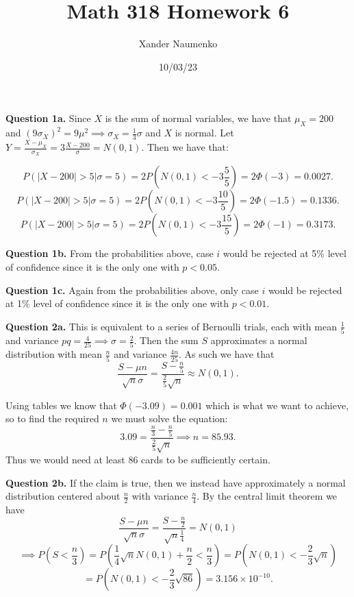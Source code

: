\documentclass[letterpaper, reqno,11pt]{article}
\begin{document}
\title{Math 318 Homework 6}
\date{10/03/23}
\author{Xander Naumenko}
\maketitle

{\medskip\noindent\bf Question 1a.} Since $X$ is the sum of normal variables, we have that $\mu_X=200$ and $(9\sigma_X)^2=9\mu ^2\implies\sigma_X=\frac{1}{3}\sigma$ and $X$ is normal. Let $Y=\frac{X-\mu_X}{\sigma_X}=3 \frac{X-200}{\sigma}=N(0, 1)$. Then we have that: 

\[
P(|X-200| >5|\sigma=5)=2P(N(0, 1)<-3 \frac{5}{5})=2\Phi(-3)=0.0027
.\]
\[
P(|X-200| >5|\sigma=5)=2P(N(0, 1)<-3 \frac{10}{5})=2\Phi(-1.5)=0.1336
.\]
\[
P(|X-200| >5|\sigma=5)=2P(N(0, 1)<-3 \frac{15}{5})=2\Phi(-1)=0.3173
.\]

{\medskip\noindent\bf Question 1b.} From the probabilities above, case $i$ would be rejected at 5\% level of confidence since it is the only one with $p<0.05$. 

{\medskip\noindent\bf Question 1c.} Again from the probabilities above, only case $i$ would be rejected at 1\% level of confidence since it is the only one with $p<0.01$. 

{\medskip\noindent\bf Question 2a.} This is equivalent to a series of Bernoulli trials, each with mean $\frac{1}{5}$ and variance $pq=\frac{4}{25}\implies\sigma = \frac{2}{5}$. Then the sum $S$ approximates a normal distribution with mean $\frac{n}{5}$ and variance $\frac{4n}{25}$. As such we have that 
\[
\frac{S-\mu n}{\sqrt{n} \sigma}=\frac{S-\frac{n}{5}}{\frac{2}{5}\sqrt{n} }\approx N(0, 1)
.\]

Using tables we know that $\Phi(-3.09)=0.001$ which is what we want to achieve, so to find the required $n$ we must solve the equation: 
\[
3.09=\frac{\frac{n}{3}-\frac{n}{5}}{\frac{2}{5}\sqrt{n} }\implies n=85.93
.\]
Thus we would need at least 86 cards to be sufficiently certain. 

{\medskip\noindent\bf Question 2b.} If the claim is true, then we instead have approximately a normal distribution centered about $\frac{n}{2}$ with variance $\frac{n}{4}$. By the central limit theorem we have
\[
\frac{S-\mu n}{\sqrt{n} \sigma}=\frac{S-\frac{n}{2}}{\sqrt{n} \frac{1}{4}}=N(0, 1)
\]
\[
\implies P\left(S<\frac{n}{3}\right)=P\left( \frac{1}{4}\sqrt{n} N(0, 1)+\frac{n}{2}<\frac{n}{3} \right)=P\left( N(0, 1)<-\frac{2}{3 }\sqrt{n}  \right) 
\]
\[
=P\left( N(0, 1)<-\frac{2}{3 }\sqrt{86}   \right)=3.156\times 10^{-10}
.\]
\end{document}
